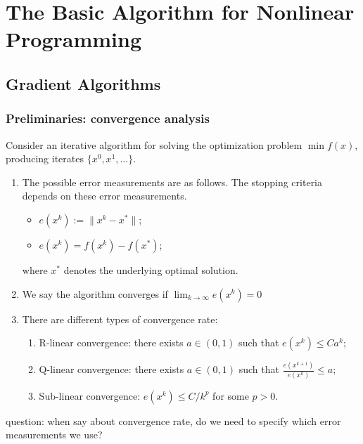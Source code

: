 \chapter{The Basic Algorithm for Nonlinear Programming}

\section{Gradient Algorithms}
\subsection{Preliminaries: convergence analysis}
Consider an iterative algorithm for solving the optimization problem $\min f(x)$, producing iterates $\{x^0,x^1,\dots\}$.
\begin{enumerate}
\item
The possible error measurements are as follows. The stopping criteria depends on these error measurements.
\begin{itemize}
\item
$e(x^k):=\|x^k-x^*\|$;
\item
$e(x^k) = f(x^k) - f(x^*)$;
\end{itemize}
where $x^*$ denotes the underlying optimal solution.
\item
We say the algorithm converges if $\lim_{k\to\infty}e(x^k) = 0$
\item
There are different types of convergence rate:
\begin{enumerate}
\item
R-linear convergence: there exists $a\in(0,1)$ such that $e(x^k)\le Ca^k$;
\item
Q-linear convergence: there exists $a\in(0,1)$ such that $\frac{e(x^{k+1})}{e(x^k)}\le a$;
\item
Sub-linear convergence: $e(x^k)\le C/k^p$ for some $p>0$.
\end{enumerate}
\end{enumerate}
question: when say about convergence rate, do we need to specify which error measurements we use?
